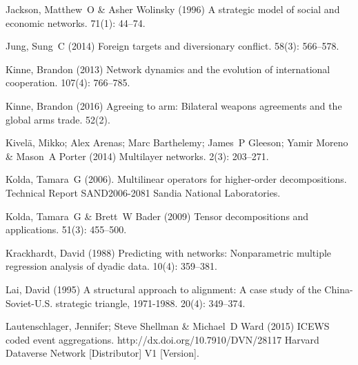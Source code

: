 \documentclass[3p,times,twocolumn,authoryear,12pt]{elsarticle}
\begin{document}
\begin{thebibliography}{}
Jackson, Matthew~O  \& Asher Wolinsky (1996) A strategic model of social and
  economic networks.
 { 71\/}(1): 44--74.

Jung, Sung~C (2014) Foreign targets and diversionary conflict.
 { 58\/}(3): 566--578.

Kinne, Brandon (2013) Network dynamics and the evolution of international
  cooperation.
 { 107\/}(4): 766--785.

Kinne, Brandon (2016) Agreeing to arm: Bilateral weapons agreements and the
  global arms trade.
 { 52\/}(2).

Kivel{\"a}, Mikko; Alex Arenas; Marc Barthelemy; James~P Gleeson; Yamir Moreno
  \& Mason~A Porter (2014) Multilayer networks.
 { 2\/}(3): 203--271.

Kolda, Tamara~G (2006).
\newblock Multilinear operators for higher-order decompositions.
\newblock Technical Report SAND2006-2081 Sandia National Laboratories.

Kolda, Tamara~G  \& Brett~W Bader (2009) Tensor decompositions and
  applications.
 { 51\/}(3): 455--500.

Krackhardt, David (1988) Predicting with networks: Nonparametric multiple
  regression analysis of dyadic data.
 { 10\/}(4): 359--381.

Lai, David (1995) A structural approach to alignment: A case study of the
  {China-Soviet-U.S.} strategic triangle, 1971-1988.
 { 20\/}(4): 349--374.

Lautenschlager, Jennifer; Steve Shellman  \& Michael~D Ward (2015) {ICEWS}
  coded event aggregations.
\newblock http://dx.doi.org/10.7910/DVN/28117 Harvard Dataverse Network
  [Distributor] V1 [Version].


\end{thebibliography}
\end{document}
